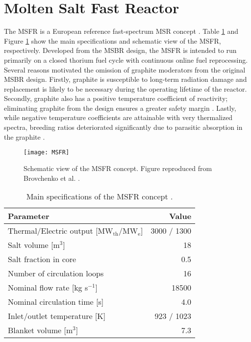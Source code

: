 \section{Molten Salt Fast Reactor} \label{sec:msfr}

The \gls{MSFR} is a European reference fast-spectrum \gls{MSR} concept
\cite{mathieu_thorium_2006, merle_optimized_2007}. Table \ref{table:msfr} and
Figure \ref{fig:msfr} show the main specifications and schematic view of the
\gls{MSFR}, respectively. Developed from the \gls{MSBR} design, the
\gls{MSFR} is intended to run primarily on a closed thorium fuel cycle with
continuous online fuel reprocessing. Several reasons motivated the omission of
graphite moderators from the original \gls{MSBR} design. Firstly, graphite is
susceptible to
long-term radiation damage and replacement is likely to be necessary during
the operating lifetime of the reactor. Secondly, graphite also has a positive
temperature coefficient of reactivity; eliminating graphite from the design
ensures a greater safety margin \cite{mathieu_thorium_2006}. Lastly, while
negative temperature coefficients are attainable with very thermalized
spectra, breeding ratios deteriorated significantly due to parasitic
absorption in the graphite \cite{mathieu_thorium_2006}.
%
\begin{figure}[htb!] 
	\centering
	\texttt{[image: MSFR]}
	\caption{Schematic view of the MSFR concept. Figure reproduced from
	Brovchenko et al. \cite{brovchenko_design-related_2013}.}
	\label{fig:msfr}
\end{figure}
%
\begin{table}[htb!]
    \small
	\caption{Main specifications of the \gls{MSFR} concept
				\cite{merle_concept_2017}.}
	\centering
	\begin{tabular}{ l r }
		\toprule
		Parameter & Value \\
		\midrule
		Thermal/Electric output [MW$_{\text{th}}$/MW$_{\text{e}}$] & 3000 /
		1300 
		\\
		Salt volume [m$^3$] & 18 \\
		Salt fraction in core & 0.5 \\
		Number of circulation loops & 16 \\
		Nominal flow rate [kg s$^{-1}$] & 18500  \\
		Nominal circulation time [s] & 4.0 \\
		Inlet/outlet temperature [K] & 923 / 1023 \\
		Blanket volume [m$^3$] & 7.3\\
		\bottomrule
	\end{tabular}
	\label{table:msfr}
\end{table}

